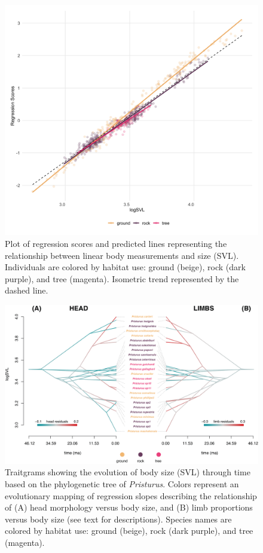 \documentclass[
  11pt,
]{article}
\begin{document}
\newpage

\begin{figure}
\includegraphics[width=1\linewidth]{Figs/figure_2_ggplot} \caption{Plot of regression scores and predicted lines representing the relationship between linear body measurements and size (SVL). Individuals are colored by habitat use: ground (beige), rock (dark purple), and tree (magenta). Isometric trend represented by the dashed line.}\label{fig:unnamed-chunk-4}
\end{figure}

\newpage

\begin{figure}
\includegraphics[width=1\linewidth]{Figs/figure_3_phenogram_RESIDUALS} \caption{Traitgrams showing the evolution of body size (SVL) through time based on the phylogenetic tree of \textit{Pristurus}. Colors represent an evolutionary mapping of regression slopes describing the relationship of (A) head morphology versus body size, and (B) limb proportions versus body size (see text for descriptions). Species names are colored by habitat use: ground (beige), rock (dark purple), and tree (magenta).}\label{fig:unnamed-chunk-5}
\end{figure}
\end{document}
